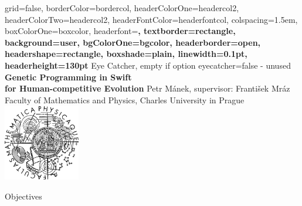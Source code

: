\documentclass[a0paper,portrait]{baposter}
\begin{document}


\begin{poster}{
	grid=false,
	borderColor=bordercol,
	headerColorOne=headercol2,
	headerColorTwo=headercol2,
	headerFontColor=headerfontcol,
	colspacing=1.5em,
	boxColorOne=boxcolor,
	headerfont=\Large\bf{}\selectfont,
	textborder=rectangle,
	background=user,
	bgColorOne=bgcolor,
	headerborder=open,
	headershape=rectangle,
	boxshade=plain,
	linewidth=0.1pt,
	headerheight=130pt
}
{
	Eye Catcher, empty if option eyecatcher=false - unused
}
{\bf{}\selectfont
	Genetic Programming in Swift\\
	for Human-competitive Evolution
}
{
	\vspace{1em} Petr Mánek, supervisor: František Mráz\\
	{\smaller Faculty of Mathematics and Physics, Charles University in Prague}
}
{
	\includegraphics[width=9em,height=9em]{logo}
}

\begin{posterbox}[name=objectives,column=0]{Objectives}
\lipsum[1]
\end{posterbox}


\end{poster}
\end{document}
